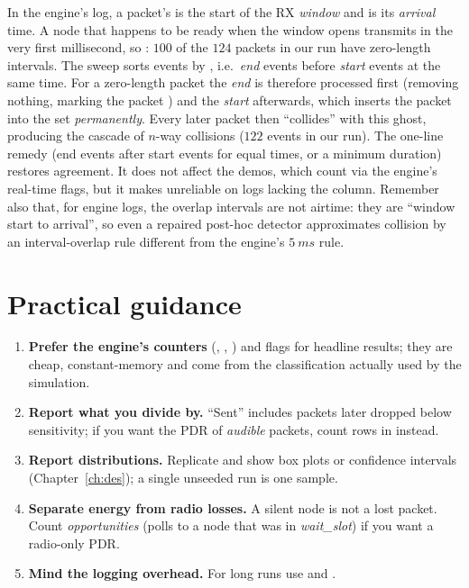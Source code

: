 \begin{reality}
In the engine's log, a packet's  is the start of the RX \emph{window} and  is its \emph{arrival} time. A node that happens to be ready when the window opens transmits in the very first millisecond, so : $100$ of the $124$ packets in our run have zero-length intervals. The sweep sorts events by , i.e.\ \emph{end} events before \emph{start} events at the same time. For a zero-length packet the \emph{end} is therefore processed first (removing nothing, marking the packet ) and the \emph{start} afterwards, which inserts the packet into the  set \emph{permanently}. Every later packet then ``collides'' with this ghost, producing the cascade of $n$-way collisions ($122$ events in our run). The one-line remedy (end events after start events for equal times, or a minimum duration) restores agreement. It does not affect the demos, which count via the engine's real-time flags, but it makes  unreliable on logs lacking the  column. Remember also that, for engine logs, the overlap intervals are not airtime: they are ``window start to arrival'', so even a repaired post-hoc detector approximates collision by an interval-overlap rule different from the engine's $\SI{5}{ms}$ rule.
\end{reality}

\section{Practical guidance}

\begin{enumerate}
 \item \textbf{Prefer the engine's counters} (, , ) and  flags for headline results; they are cheap, constant-memory and come from the classification actually used by the simulation.
 \item \textbf{Report what you divide by.} ``Sent'' includes packets later dropped below sensitivity; if you want the PDR of \emph{audible} packets, count rows in  instead.
 \item \textbf{Report distributions.} Replicate and show box plots or confidence intervals (Chapter~\ref{ch:des}); a single unseeded run is one sample.
 \item \textbf{Separate energy from radio losses.} A silent node is not a lost packet. Count \emph{opportunities} (polls to a node that was in \emph{wait\_slot}) if you want a radio-only PDR.
 \item \textbf{Mind the logging overhead.} For long runs use  and .
\end{enumerate}


